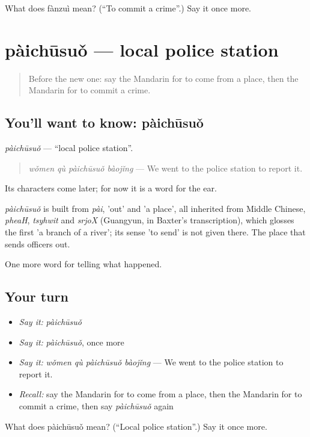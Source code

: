\begin{tcolorbox}[breakable,colback=teal!4,colframe=teal!35!black,title={Before you move on}]
What does fànzuì mean? (\textquotedblleft{}To commit a crime\textquotedblright{}.) Say it once more.
\end{tcolorbox}
\section[pàichūsuǒ]{pàichūsuǒ — local police station}

\label{lesson:ZH-C308-paichusuo}



\begin{quote}
Before the new one: say the Mandarin for to come from a place, then the Mandarin for to commit a crime.
\end{quote}

\subsection*{You'll want to know: pàichūsuǒ}
\emph{pàichūsuǒ} — \textquotedblleft{}local police station\textquotedblright{}.

\begin{quote}
\emph{wǒmen qù pàichūsuǒ bàojǐng} — We went to the police station to report it.
\end{quote}

Its characters come later; for now it is a word for the ear.

\begin{cousinweb}
\emph{pàichūsuǒ} is built from \emph{pài},  'out' and  'a place', all inherited from Middle Chinese, \emph{pheaH}, \emph{tsyhwit} and \emph{srjoX} (Guangyun, in Baxter's transcription), which glosses the first 'a branch of a river'; its sense 'to send' is not given there. The place that sends officers out.
\end{cousinweb}

\begin{grammarlens}[title={What you've built}]
One more word for telling what happened.
\end{grammarlens}

\subsection*{Your turn}
\begin{itemize}
\raggedright
  \item \emph{Say it:} \emph{pàichūsuǒ}
  \item \emph{Say it:} \emph{pàichūsuǒ}, once more
  \item \emph{Say it:} \emph{wǒmen qù pàichūsuǒ bàojǐng} — We went to the police station to report it.
  \item \emph{Recall:} say the Mandarin for to come from a place, then the Mandarin for to commit a crime, then say \emph{pàichūsuǒ} again
\end{itemize}

\begin{tcolorbox}[breakable,colback=teal!4,colframe=teal!35!black,title={Before you move on}]
What does pàichūsuǒ mean? (\textquotedblleft{}Local police station\textquotedblright{}.) Say it once more.
\end{tcolorbox}
